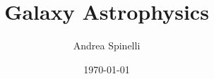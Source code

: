 \documentclass[a4paper,12pt]{report}
\institute{UniTs - University of Trieste}
\title{Galaxy Astrophysics}
\author{Andrea Spinelli}
\date{\today}
\begin{document}
\maketitle



\toc


\printbibliography
\end{document}
